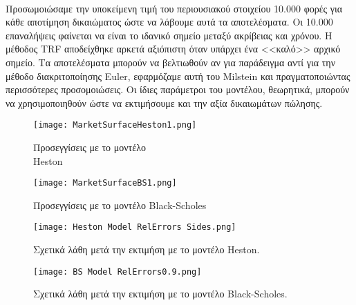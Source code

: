 \documentclass[12pt,a4paper,twoside,openany]{book}
\begin{document}
 	\vspace{2.5mm}\\
 	\noindent Προσωμοιώσαμε την υποκείμενη τιμή του περιουσιακού στοιχείου 10.000 φορές για κάθε αποτίμηση δικαιώματος ώστε να λάβουμε αυτά τα αποτελέσματα. Οι 10.000 επαναλήψεις φαίνεται να είναι το ιδανικό σημείο μεταξύ ακρίβειας και χρόνου. Η μέθοδος TRF αποδείχθηκε αρκετά αξιόπιστη όταν υπάρχει ένα <<καλό>> αρχικό σημείο. Τα αποτελέσματα μπορούν να βελτιωθούν αν για παράδειγμα αντί για την μέθοδο διακριτοποίησης Euler, εφαρμόζαμε αυτή του Milstein \cite{EulerDiscr} και πραγματοποιώντας περισσότερες προσομοιώσεις. Οι ίδιες παράμετροι του μοντέλου, θεωρητικά, μπορούν να χρησιμοποιηθούν ώστε να εκτιμήσουμε και την αξία δικαιωμάτων πώλησης.
 	
 	\begin{figure}[h]
 		\begin{minipage}[b]{0.5\linewidth}
 			\centering
 			\texttt{[image: MarketSurfaceHeston1.png]}
 			\caption{Προσεγγίσεις με το μοντέλο\\ Heston}
 			\label{fig:SurfaceHeston}
 		\end{minipage}
 		\hspace{0.02\linewidth}  %
 		\begin{minipage}[b]{0.5\linewidth}
 			\centering
 			\texttt{[image: MarketSurfaceBS1.png]}
 			\caption{Προσεγγίσεις με το μοντέλο Black-Scholes}
 			\label{fig:SurfaceBS}
 		\end{minipage}
 	\end{figure}
 	
 	\begin{figure}[h]
 		\centering
 		\texttt{[image: Heston Model RelErrors Sides.png]}
 		\caption{Σχετικά λάθη μετά την εκτιμήση με το μοντέλο Heston.}
 		\label{fig:RelErrorsWithHeston}
 	\end{figure}
 	\clearpage
 	
 	
 	\begin{figure}[h]
 		\centering
 		\texttt{[image: BS Model RelErrors0.9.png]}
 		\caption{Σχετικά λάθη μετά την εκτιμήση με το μοντέλο Black-Scholes.}
 		\label{fig:RelErrorsWithBS}
 		\vspace{4mm}
 	\end{figure}
 	
\end{document}
